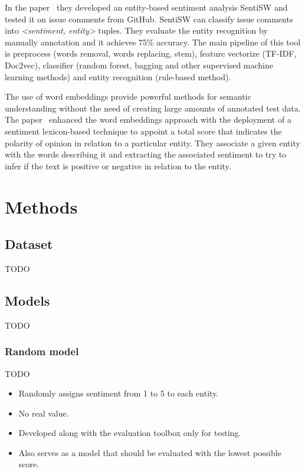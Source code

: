 \documentclass[11pt,a4paper]{article}
\begin{document}
In the paper~\cite{ding2018entity} they developed an entity-based sentiment analysis SentiSW and tested it on issue comments from GitHub.
SentiSW can classify issue comments into \emph{<sentiment, entity>} tuples. 
They evaluate the entity recognition by manually annotation and it achieves 75\% accuracy. 
The main pipeline of this tool is preprocess (words removal, words replacing, stem), feature vectorize (TF-IDF, Doc2vec), classifier (random forest, bagging and other supervised machine learning methods) and entity recognition (rule-based method). 

The use of word embeddings provide powerful methods for semantic understanding without the need of creating large amounts of annotated test data. 
The paper~\cite{sweeney2017multi} enhanced the word embeddings approach with the  deployment of a sentiment lexicon-based technique to appoint a total score that indicates the polarity of opinion in relation to a particular entity. 
They associate a given entity with the words describing it and extracting the associated sentiment to try to infer if the text is positive or negative in relation to the entity.



\section{Methods}

\subsection{Dataset}

TODO

\subsection{Models}

TODO

\subsubsection{Random model}

TODO
\begin{itemize}
    \item Randomly assigns sentiment from 1 to 5 to each entity.
    \item No real value.
    \item Developed along with the evaluation toolbox only for testing.
    \item Also serves as a model that should be evaluated with the lowest possible score.
\end{itemize}
\end{document}
